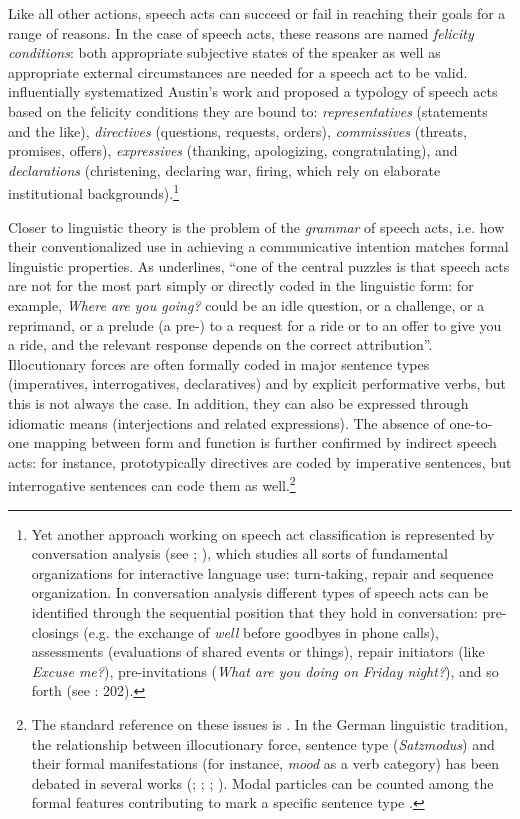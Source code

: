 Like all other actions, speech acts can succeed or fail in reaching their goals for a range of reasons. In the case of speech acts, these reasons are named \textit{felicity conditions}: both appropriate subjective states of the speaker as well as appropriate external circumstances are needed for a speech act to be valid. \citet{Searle1969} influentially systematized Austin’s work and proposed a typology of speech acts based on the felicity conditions they are bound to: \textit{representatives} (statements and the like), \textit{directives} (questions, requests, orders), \textit{commissives} (threats, promises, offers), \textit{expressives} (thanking, apologizing, congratulating), and \textit{declarations} (christening, declaring war, firing, which rely on elaborate institutional backgrounds).\footnote{Yet another approach working on speech act classification is represented by conversation analysis (see \citealt{SacksEtAl1974}; \citealt{Schegloff2017}), which studies all sorts of fundamental organizations for interactive language use: turn-taking, repair and sequence organization. In conversation analysis different types of speech acts can be identified through the sequential position that they hold in conversation: pre-closings (e.g. the exchange of \textit{well} before goodbyes in phone calls), assessments (evaluations of shared events or things), repair initiators (like \textit{Excuse me?}), pre-invitations (\textit{What are you doing on Friday night?}), and so forth (see \citealt{Levinson2017}: 202).}

Closer to linguistic theory is the problem of the \textit{grammar} of speech acts, i.e. how their conventionalized use in achieving a communicative intention matches formal linguistic properties. As \citet[202--203]{Levinson2017} underlines, “one of the central puzzles is that speech acts are not for the most part simply or directly coded in the linguistic form: for example, \textit{Where are you going?} could be an idle question, or a challenge, or a reprimand, or a prelude (a pre-) to a request for a ride or to an offer to give you a ride, and the relevant response depends on the correct attribution”. Illocutionary forces are often formally coded in major sentence types (imperatives, interrogatives, declaratives) and by explicit performative verbs, but this is not always the case. In addition, they can also be expressed through idiomatic means (interjections and related expressions). The absence of one-to-one mapping between form and function is further confirmed by indirect speech acts: for instance, prototypically directives are coded by imperative sentences, but interrogative sentences can code them as well.\footnote{The standard reference on these issues is \citet{SadockZwicky1985}. In the German linguistic tradition, the relationship between illocutionary force, sentence type (\textit{Satzmodus}) and their formal manifestations (for instance, \textit{mood} as a verb category) has been debated in several works (\citealt{Meibauer1987}; \citealt{Rosengren1992}; \citealt{Altmann1993}; \citealt{MeibauerEtAl2013}). Modal particles can be counted among the formal features contributing to mark a specific sentence type \citep{Thurmair1989}.}

